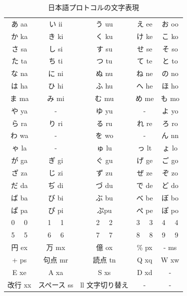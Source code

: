 \documentclass[a4j]{jarticle}
\begin{document}
  \begin{table}[H]
    \caption{日本語プロトコルの文字表現}
  \label{jpp}
  \begin{center}
      \begin{tabular}{c|c|c|c|c}\hline
あ aa & い ii & う uu & え ee & お oo \\ 
か ka & き ki & く ku & け ke & こ ko \\ 
さ sa & し si & す su & せ se & そ so \\ 
た ta & ち ti & つ tu & て te & と to \\ 
な na & に ni & ぬ nu & ね ne & の no \\ 
は ha & ひ hi & ふ hu & へ he & ほ ho \\ 
ま ma & み mi & む mu & め me & も mo \\ 
や ya & -  & ゆ yu & -  & よ yo \\ 
ら ra & り ri & る ru & れ re & ろ ro \\ 
わ wa & -  & を wo & -  & ん nn \\ 
ゃ la & - & ゅ lu & っ lt & ょ lo \\ 
が ga & ぎ gi & ぐ gu & げ ge & ご go \\ 
ざ za & じ zi & ず zu & ぜ ze & ぞ zo \\
だ da & ぢ di & づ du & で de & ど do \\
ば ba & び bi & ぶ bu & べ be & ぼ bo \\ 
ぱ pa & ぴ pi & ぷpu &  ぺ pe & ぽ po \\ 
0 　0 & 1 　1 & 2 　2 & 3 　3 & 4 　4 \\ 
5 　5 & 6 　6 & 7 　7 & 8 　8 & 9 　9 \\ 
円 ex & 万 mx & 億 ox & \% px & - ms \\ 
+ ps & 句点 mr & 読点 tn & Q xq & W xw \\ 
E xe & A xa & S xs & D xd & - \\ 
改行 xx & スペース ss & ll 文字切り替え & - & - \\ \hline
      \end{tabular}
  \end{center}
  \end{table}
  
\end{document}
